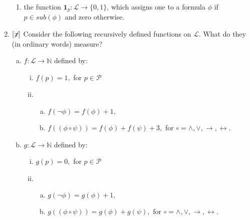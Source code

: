 \begin{enumerate}[\thesection.1]
\begin{enumerate}
			\item the function $\mathbf{1}_p:\mathcal{L}\to\{0,1\}$, which assigns one to a formula $\phi$ if $p\in sub(\phi)$ and zero otherwise.
		
		\end{enumerate}
		
		\item $[\not\hspace{-.5ex}x]$ Consider the following recursively defined functions on $\mathcal{L}$. What do they (in ordinary words) measure?
		
			\begin{enumerate}[(a)]
			
				\item $f:\mathcal{L}\to\mathbb{N}$ defined by:
				
					\begin{enumerate}[(i)]

					\item $f(p)=1,$ for $p\in\mathcal{P}$

					\item 			\begin{enumerate}[(a)]

					\item $f(\neg \phi)=f(\phi)+1,$

					\item $f((\phi\circ \psi))=f(\phi)+f(\psi)+3,$ for $\circ=\land,\lor,\to,\leftrightarrow.$
					
					\end{enumerate}
					\end{enumerate}
					
				\item $g:\mathcal{L}\to\mathbb{N}$ defined by:
				
					\begin{enumerate}[(i)]

					\item $g(p)=0,$ for $p\in\mathcal{P}$

					\item 			\begin{enumerate}[(a)]

					\item $g(\neg \phi)=g(\phi)+1,$

					\item $g((\phi\circ \psi))=g(\phi)+g(\psi),$ for $\circ=\land,\lor,\to,\leftrightarrow.$
					
					\end{enumerate}
					\end{enumerate}
					

\end{enumerate}
\end{enumerate}
